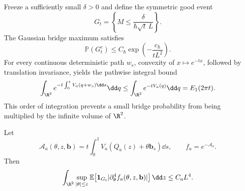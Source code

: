Freeze a sufficiently small \(\delta>0\) and define the symmetric good
event
\begin{equation}
 G_t=\left\{M\le\frac{\delta}{\hbar\sqrt t\,L}\right\}.
 \label{eq:app-good-bridge-event}
\end{equation}
The Gaussian bridge maximum satisfies
\begin{equation}
 \mathbb P(G_t^c)\le C_{\hbar}
 \exp\!\left(-\frac{c_{\hbar}}{tL^2}\right).
 \label{eq:app-bridge-tail}
\end{equation}
For every continuous deterministic path \(w_s\), convexity of
\(x\mapsto e^{-tx}\), followed by translation invariance, yields the
pathwise integral bound
\begin{equation}
 \int_{\R^2}e^{-t\int_0^1V_a(q+w_s)\dd s}\dd q
 \le\int_{\R^2}e^{-tV_a(q)}\dd q
 =E_1(2\pi t).
 \label{eq:app-pathwise-jensen}
\end{equation}
This order of integration prevents a small bridge probability from being
multiplied by the infinite volume of \(\R^2\).

\begin{lemma}
\label{lem:app-fourth-amplitude}
Let
\begin{equation}
 \mathcal A_a(\theta,z,\mathbf b)
 =t\int_0^1V_a(Q_a(z)+\theta\mathbf b_s)\dd s,
 \qquad f_a=e^{-\mathcal A_a}.
\end{equation}
Then
\begin{equation}
 \int_{\R^2}\sup_{|\theta|\le\varepsilon}
 \mathbb E\!\left[
 \mathbf1_{G_t}|\partial_\theta^4f_a(\theta,z,\mathbf b)|
 \right]\dd z
 \le C_aL^4.
 \label{eq:app-fourth-amplitude-bound}
\end{equation}
\end{lemma}

